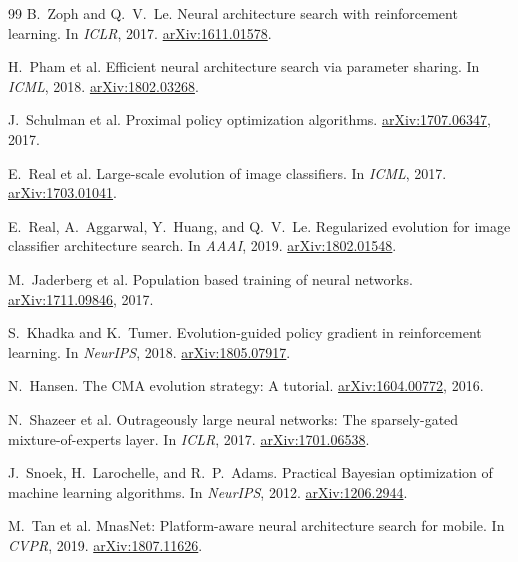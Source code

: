 \documentclass[10pt,twocolumn,letterpaper]{article}
\theoremstyle{remark}
\begin{document}
{\begin{thebibliography}{99}
B.~Zoph and Q.~V.~Le.
\newblock Neural architecture search with reinforcement learning.
\newblock In \emph{ICLR}, 2017.
\newblock \href{https://arxiv.org/abs/1611.01578}{arXiv:1611.01578}.

H.~Pham et al.
\newblock Efficient neural architecture search via parameter sharing.
\newblock In \emph{ICML}, 2018.
\newblock \href{https://arxiv.org/abs/1802.03268}{arXiv:1802.03268}.

J.~Schulman et al.
\newblock Proximal policy optimization algorithms.
\newblock \href{https://arxiv.org/abs/1707.06347}{arXiv:1707.06347}, 2017.

E.~Real et al.
\newblock Large-scale evolution of image classifiers.
\newblock In \emph{ICML}, 2017.
\newblock \href{https://arxiv.org/abs/1703.01041}{arXiv:1703.01041}.

E.~Real, A.~Aggarwal, Y.~Huang, and Q.~V.~Le.
\newblock Regularized evolution for image classifier architecture search.
\newblock In \emph{AAAI}, 2019.
\newblock \href{https://arxiv.org/abs/1802.01548}{arXiv:1802.01548}.

M.~Jaderberg et al.
\newblock Population based training of neural networks.
\newblock \href{https://arxiv.org/abs/1711.09846}{arXiv:1711.09846}, 2017.

S.~Khadka and K.~Tumer.
\newblock Evolution-guided policy gradient in reinforcement learning.
\newblock In \emph{NeurIPS}, 2018.
\newblock \href{https://arxiv.org/abs/1805.07917}{arXiv:1805.07917}.

N.~Hansen.
\newblock The CMA evolution strategy: A tutorial.
\newblock \href{https://arxiv.org/abs/1604.00772}{arXiv:1604.00772}, 2016.

N.~Shazeer et al.
\newblock Outrageously large neural networks: The sparsely-gated mixture-of-experts layer.
\newblock In \emph{ICLR}, 2017.
\newblock \href{https://arxiv.org/abs/1701.06538}{arXiv:1701.06538}.

J.~Snoek, H.~Larochelle, and R.~P.~Adams.
\newblock Practical Bayesian optimization of machine learning algorithms.
\newblock In \emph{NeurIPS}, 2012.
\newblock \href{https://arxiv.org/abs/1206.2944}{arXiv:1206.2944}.

M.~Tan et al.
\newblock MnasNet: Platform-aware neural architecture search for mobile.
\newblock In \emph{CVPR}, 2019.
\newblock \href{https://arxiv.org/abs/1807.11626}{arXiv:1807.11626}.


\end{thebibliography}}
\end{document}
